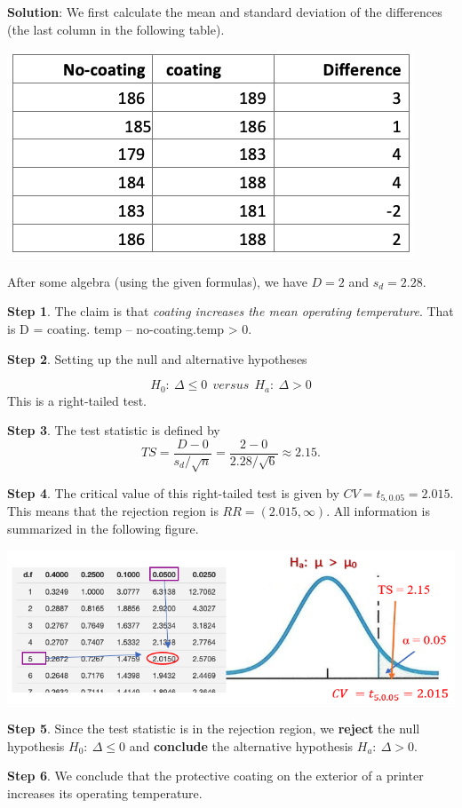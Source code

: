 \documentclass[
]{book}
\begin{document}
\textbf{Solution}: We first calculate the mean and standard deviation of the differences (the last column in the following table).

\begin{center}\includegraphics[width=0.4\linewidth]{week10/coatingDataDIff} \end{center}

After some algebra (using the given formulas), we have \(D =2\) and \(s_d=2.28\).

\textbf{Step 1}. The claim is that \emph{coating increases the mean operating temperature}. That is D = coating. temp -- no-coating.temp \textgreater{} 0.

\textbf{Step 2}. Setting up the null and alternative hypotheses

\[H_0: \ \Delta  \le 0  \  \  versus   \    \    H_a: \ \Delta > 0\]
This is a right-tailed test.

\textbf{Step 3}. The test statistic is defined by
\[
TS = \frac{D - 0}{s_d/\sqrt{n}} = \frac{2-0}{2.28/\sqrt{6}} \approx 2.15.
\]

\textbf{Step 4}. The critical value of this right-tailed test is given by
\(CV =t_{5,0.05} = 2.015\). This means that the rejection region is \(RR = (2.015,\infty)\). All information is summarized in the following figure.

\begin{center}\includegraphics[width=0.7\linewidth]{week10/example02} \end{center}

\textbf{Step 5}. Since the test statistic is in the rejection region, we \textbf{reject} the null hypothesis \(H_0: \ \Delta \le 0\) and \textbf{conclude} the alternative hypothesis \(H_a: \ \Delta > 0\).

\textbf{Step 6}. We conclude that the protective coating on the exterior of a printer increases its operating temperature.
\end{document}
